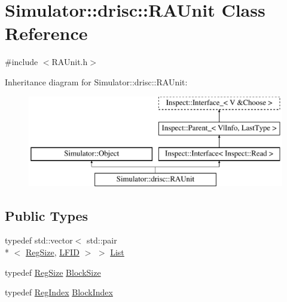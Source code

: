 \hypertarget{class_simulator_1_1drisc_1_1_r_a_unit}{\section{Simulator\+:\+:drisc\+:\+:R\+A\+Unit Class Reference}
\label{class_simulator_1_1drisc_1_1_r_a_unit}
}


{\ttfamily \#include $<$R\+A\+Unit.\+h$>$}

Inheritance diagram for Simulator\+:\+:drisc\+:\+:R\+A\+Unit\+:\begin{figure}[H]
\begin{center}
\leavevmode
\includegraphics[height=4.000000cm]{class_simulator_1_1drisc_1_1_r_a_unit}
\end{center}
\end{figure}
\subsection*{Public Types}
\begin{DoxyCompactItemize}
\item 
typedef std\+::vector$<$ std\+::pair\\*
$<$ \hyperlink{namespace_simulator_a7c5ca3b196c951c92b8159e54e76075f}{Reg\+Size}, \hyperlink{namespace_simulator_aaccbc706b2d6c99085f52f6dfc2333e4}{L\+F\+I\+D} $>$ $>$ \hyperlink{class_simulator_1_1drisc_1_1_r_a_unit_abd48271d9597ddbe20207e2a4e66d425}{List}
\item 
typedef \hyperlink{namespace_simulator_a7c5ca3b196c951c92b8159e54e76075f}{Reg\+Size} \hyperlink{class_simulator_1_1drisc_1_1_r_a_unit_aa5b30133d4961a3b8e06e4fda505ea3d}{Block\+Size}
\item 
typedef \hyperlink{namespace_simulator_ab00c9033de4c9a17db7b53d6c292515c}{Reg\+Index} \hyperlink{class_simulator_1_1drisc_1_1_r_a_unit_a8a53a5257420a14753fa3f205c17a01c}{Block\+Index}
\end{DoxyCompactItemize}

